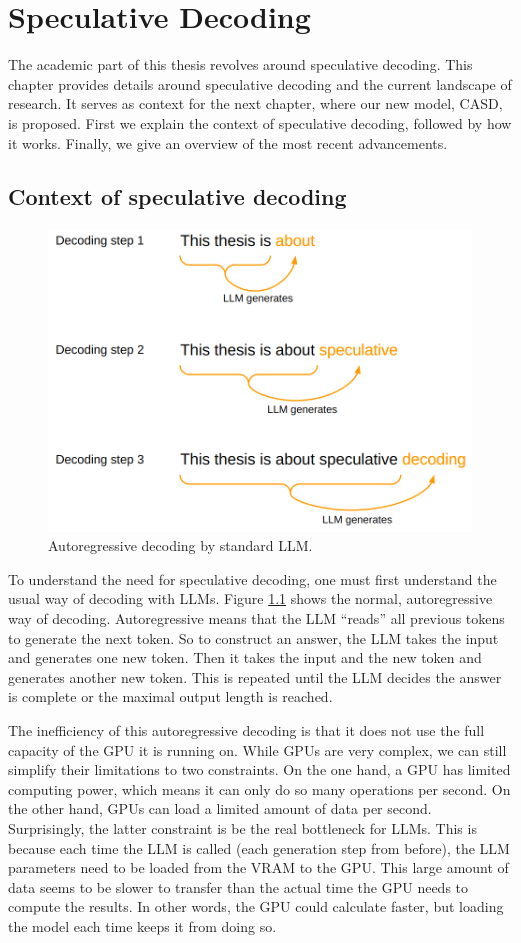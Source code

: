 
\chapter{Speculative Decoding}
\label{sec:speculative_decoding}

The academic part of this thesis revolves around speculative decoding. This chapter provides details around speculative decoding and the current landscape of research. It serves as context for the next chapter, where our new model, CASD, is proposed. First we explain the context of speculative decoding, followed by how it works. Finally, we give an overview of the most recent advancements. 

\section{Context of speculative decoding}

\begin{figure}[h]
	\centering
	\includegraphics[width=0.7\linewidth]{fig/spec_dec_autoregressive.png}
	\caption{Autoregressive decoding by standard LLM.}
	\label{fig:spec_dec_autoregressive}
\end{figure}

To understand the need for speculative decoding, one must first understand the usual way of decoding with LLMs. Figure \ref{fig:spec_dec_autoregressive} shows the normal, autoregressive way of decoding. Autoregressive means that the LLM ``reads'' all previous tokens to generate the next token. So to construct an answer, the LLM takes the input and generates one new token. Then it takes the input and the new token and generates another new token. This is repeated until the LLM decides the answer is complete or the maximal output length is reached.

The inefficiency of this autoregressive decoding is that it does not use the full capacity of the GPU it is running on. While GPUs are very complex, we can still simplify their limitations to two constraints. On the one hand, a GPU has limited computing power, which means it can only do so many operations per second. On the other hand, GPUs can load a limited amount of data per second. Surprisingly, the latter constraint is be the real bottleneck for LLMs. This is because each time the LLM is called (each generation step from before), the LLM parameters need to be loaded from the VRAM to the GPU. This large amount of data seems to be slower to transfer than the actual time the GPU needs to compute the results. In other words, the GPU could calculate faster, but loading the model each time keeps it from doing so.

